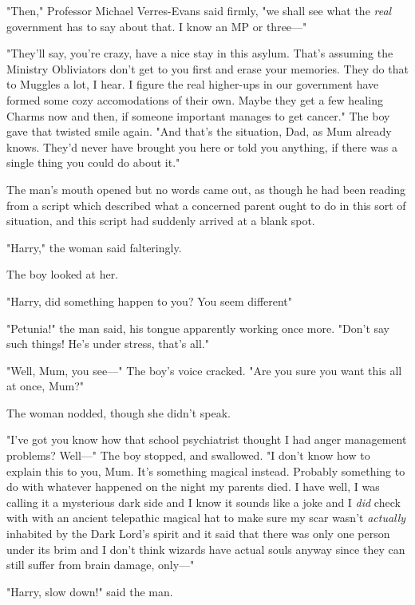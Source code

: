 "Then," Professor Michael Verres-Evans said firmly, "we shall see what the
\emph{real} government has to say about that. I know an MP or three—"

"They'll say, you're crazy, have a nice stay in this asylum. That's assuming
the Ministry Obliviators don't get to you first and erase your memories. They
do that to Muggles a lot, I hear. I figure the real higher-ups in our
government have formed some cozy accomodations of their own. Maybe they get a
few healing Charms now and then, if someone important manages to get cancer."
The boy gave that twisted smile again. "And that's the situation, Dad, as Mum
already knows. They'd never have brought you here or told you anything, if
there was a single thing you could do about it."

The man's mouth opened but no words came out, as though he had been reading
from a script which described what a concerned parent ought to do in this sort
of situation, and this script had suddenly arrived at a blank spot.

"Harry," the woman said falteringly.

The boy looked at her.

"Harry, did something happen to you? You seem{\el} different{\el}"

"Petunia!" the man said, his tongue apparently working once more. "Don't say
such things! He's under stress, that's all."

"Well, Mum, you see—" The boy's voice cracked. "Are you sure you want this
all at once, Mum?"

The woman nodded, though she didn't speak.

"I've got{\el} you know how that school psychiatrist thought I had anger
management problems? Well—" The boy stopped, and swallowed. "I don't know how
to explain this to you, Mum. It's something magical instead. Probably something
to do with whatever happened on the night my parents died. I have{\el} well,
I was calling it a mysterious dark side and I know it sounds like a joke and I
\emph{did} check with{\el} with an ancient telepathic magical hat to make
sure my scar wasn't \emph{actually} inhabited by the Dark Lord's spirit and it
said that there was only one person under its brim and I don't think wizards
have actual souls anyway since they can still suffer from brain damage, only—"

"Harry, slow down!" said the man.

